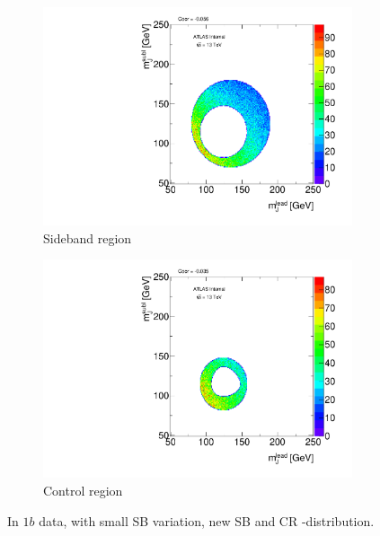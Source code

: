 \begin{figure}[htbp!]
\centering
\captionsetup{justification=centering}
    \begin{subfigure}[b]{0.39\textwidth}
        \includegraphics[width=\textwidth,angle=-90]{figures/boosted/Syst_CRSB/SB_Small_Sideband_OneTag_mH0H1.pdf}
        \caption{Sideband region}
        \label{CRSB:SB_Small_SB}
    \end{subfigure}
    \quad
    \begin{subfigure}[b]{0.39\textwidth}
        \includegraphics[width=\textwidth,angle=-90]{figures/boosted/Syst_CRSB/SB_Small_Control_OneTag_mH0H1.pdf}
        \caption{Control region}
        \label{CRSB:SB_Small_CR}
    \end{subfigure}
\caption{In $1b$ data, with small SB variation, new SB and CR \mleadJ-\msublJ distribution.}
\label{CRSB:SB_Small}
\end{figure}

